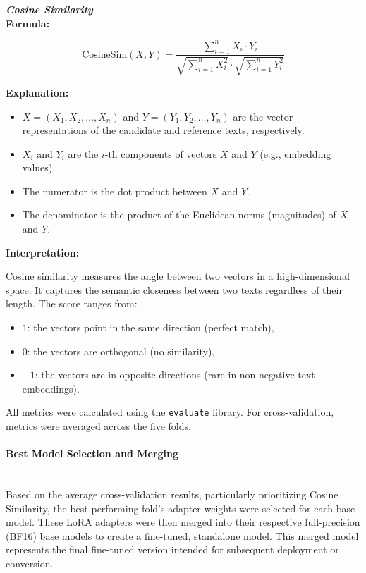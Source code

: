 \documentclass[runningheads]{llncs}
\begin{document}
\vspace{0.8em}

\noindent \textbf{\textit{Cosine Similarity}}\\

\textbf{Formula:}

\begin{equation}
\text{CosineSim}(X, Y) = \frac{\sum_{i=1}^{n} X_i \cdot Y_i}{\sqrt{\sum_{i=1}^{n} X_i^2} \cdot \sqrt{\sum_{i=1}^{n} Y_i^2}}
\end{equation}

\textbf{Explanation:}
\begin{itemize}
  \item $X = (X_1, X_2, \dots, X_n)$ and $Y = (Y_1, Y_2, \dots, Y_n)$ are the vector representations of the candidate and reference texts, respectively.
  \item $X_i$ and $Y_i$ are the $i$-th components of vectors $X$ and $Y$ (e.g., embedding values).
  \item The numerator is the dot product between $X$ and $Y$.
  \item The denominator is the product of the Euclidean norms (magnitudes) of $X$ and $Y$.
\end{itemize}

\textbf{Interpretation:}

Cosine similarity measures the angle between two vectors in a high-dimensional space. It captures the semantic closeness between two texts regardless of their length. The score ranges from:
\begin{itemize}
  \item $1$: the vectors point in the same direction (perfect match),
  \item $0$: the vectors are orthogonal (no similarity),
  \item $-1$: the vectors are in opposite directions (rare in non-negative text embeddings).
\end{itemize}

All metrics were calculated using the \texttt{evaluate} library. For cross-validation, metrics were averaged across the five folds.

\paragraph{Best Model Selection and Merging}\mbox{}\\
Based on the average cross-validation results, particularly prioritizing Cosine Similarity, the best performing fold's adapter weights were selected for each base model. These LoRA adapters were then merged into their respective full-precision (BF16) base models to create a fine-tuned, standalone model. This merged model represents the final fine-tuned version intended for subsequent deployment or conversion.
\end{document}
